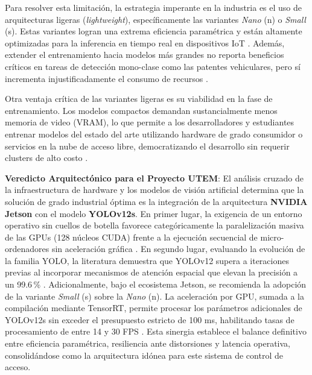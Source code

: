 Para resolver esta limitación, la estrategia imperante en la industria es el uso de arquitecturas ligeras (\textit{lightweight}), específicamente las variantes \textit{Nano} (n) o \textit{Small} (s). Estas variantes logran una extrema eficiencia paramétrica y están altamente optimizadas para la inferencia en tiempo real en dispositivos IoT \parencite{mobeenRealTimeAutomaticLicense2026}. Además, extender el entrenamiento hacia modelos más grandes no reporta beneficios críticos en tareas de detección mono-clase como las patentes vehiculares, pero sí incrementa injustificadamente el consumo de recursos \parencite{buleuDeepLearningBasedSystem2025a}.

Otra ventaja crítica de las variantes ligeras es su viabilidad en la fase de entrenamiento. Los modelos compactos demandan sustancialmente menos memoria de video (VRAM), lo que permite a los desarrolladores y estudiantes entrenar modelos del estado del arte utilizando hardware de grado consumidor o servicios en la nube de acceso libre, democratizando el desarrollo sin requerir clusters de alto costo \parencite{YOLOv10VsYOLOv82025}.

\textbf{Veredicto Arquitectónico para el Proyecto UTEM}: 
El análisis cruzado de la infraestructura de hardware y los modelos de visión artificial determina que la solución de grado industrial óptima es la integración de la arquitectura \textbf{NVIDIA Jetson} con el modelo \textbf{YOLOv12s}. 
En primer lugar, la exigencia de un entorno operativo sin cuellos de botella favorece categóricamente la paralelización masiva de las GPUs (128 núcleos CUDA) frente a la ejecución secuencial de micro-ordenadores sin aceleración gráfica \parencite{ammarMultiStageDeepLearningBasedVehicle2023}. En segundo lugar, evaluando la evolución de la familia YOLO, la literatura demuestra que YOLOv12 supera a iteraciones previas al incorporar mecanismos de atención espacial que elevan la precisión a un 99.6\,\% \parencite{buleuDeepLearningBasedSystem2025a}. 
Adicionalmente, bajo el ecosistema Jetson, se recomienda la adopción de la variante \textit{Small} (s) sobre la \textit{Nano} (n). La aceleración por GPU, sumada a la compilación mediante TensorRT, permite procesar los parámetros adicionales de YOLOv12s sin exceder el presupuesto estricto de 100 ms, habilitando tasas de procesamiento de entre 14 y 30 FPS \parencite{sonnaraEfficientRealtimeLicense2025, meesadAdvancedDeepLearning2025a}. Esta sinergia establece el balance definitivo entre eficiencia paramétrica, resiliencia ante distorsiones y latencia operativa, consolidándose como la arquitectura idónea para este sistema de control de acceso.

